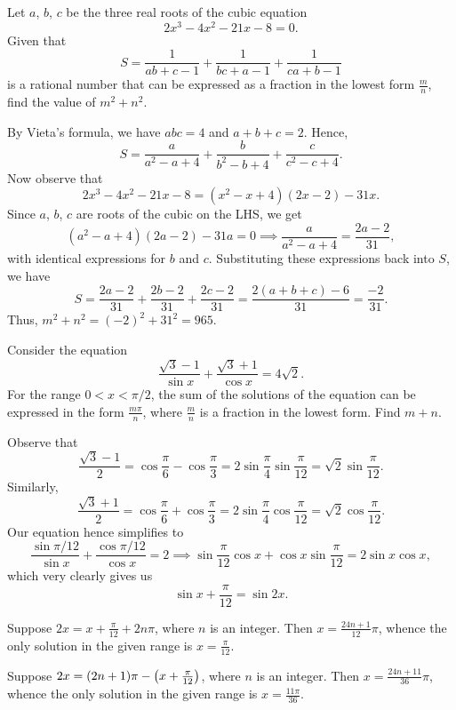 \begin{question}[965]\label{A::2024-S-1-14}
    Let $a$, $b$, $c$ be the three real roots of the cubic equation \[2x^3 - 4x^2 - 21x - 8 = 0.\] Given that \[S = \frac1{ab + c -1} + \frac1{bc + a -1} + \frac1{ca + b - 1}\] is a rational number that can be expressed as a fraction in the lowest form $\frac{m}{n}$, find the value of $m^2 + n^2$.
\end{question}

By Vieta's formula, we have $abc = 4$ and $a + b + c = 2$. Hence, \[S = \frac{a}{a^2 - a + 4} + \frac{b}{b^2 - b + 4} + \frac{c}{c^2 - c + 4}.\] Now observe that \[2x^3 - 4x^2 - 21x - 8 = (x^2 - x + 4)(2x - 2) - 31 x.\] Since $a$, $b$, $c$ are roots of the cubic on the LHS, we get \[(a^2 - a + 4)(2a - 2) - 31a = 0 \implies \frac{a}{a^2 - a + 4} = \frac{2a - 2}{31},\] with identical expressions for $b$ and $c$. Substituting these expressions back into $S$, we have \[S = \frac{2a - 2}{31} + \frac{2b - 2}{31} + \frac{2c - 2}{31} = \frac{2(a+b+c) - 6}{31} = \frac{-2}{31}.\] Thus, $m^2 + n^2 = (-2)^2 + 31^2 = 965$.

\begin{question}[25]\label{A::2024-S-1-15}
    Consider the equation \[\frac{\sqrt3 - 1}{\sin x} + \frac{\sqrt3 + 1}{\cos x} = 4\sqrt2.\] For the range $0 < x < \pi/2$, the sum of the solutions of the equation can be expressed in the form $\frac{m\pi}{n}$, where $\frac{m}{n}$ is a fraction in the lowest form. Find $m + n$.
\end{question}

Observe that \[\frac{\sqrt3 - 1}{2} = \cos \frac\pi6 - \cos \frac\pi3 = 2\sin \frac\pi4 \sin \frac\pi{12} = \sqrt2 \sin \frac\pi{12}.\] Similarly, \[\frac{\sqrt3 + 1}{2} = \cos \frac\pi6 + \cos \frac\pi3 = 2\sin\frac\pi4 \cos\frac\pi{12} = \sqrt 2 \cos\frac\pi{12}.\] Our equation hence simplifies to \[\frac{\sin{\pi/12}}{\sin x} + \frac{\cos{\pi/12}}{\cos x} = 2 \implies \sin \frac\pi{12} \cos x + \cos x \sin \frac\pi{12} = 2\sin x \cos x,\] which very clearly gives us \[\sin{x + \frac\pi{12}} = \sin{2x}.\]

 Suppose $2x = x + \frac\pi{12} + 2n\pi$, where $n$ is an integer. Then $x = \frac{24n + 1}{12}\pi$, whence the only solution in the given range is $x = \frac{\pi}{12}$.

 Suppose $2x = (2n + 1)\pi - \left( x + \frac\pi{12} \right)$, where $n$ is an integer. Then $x = \frac{24n + 11}{36} \pi$, whence the only solution in the given range is $x = \frac{11\pi}{36}$.

